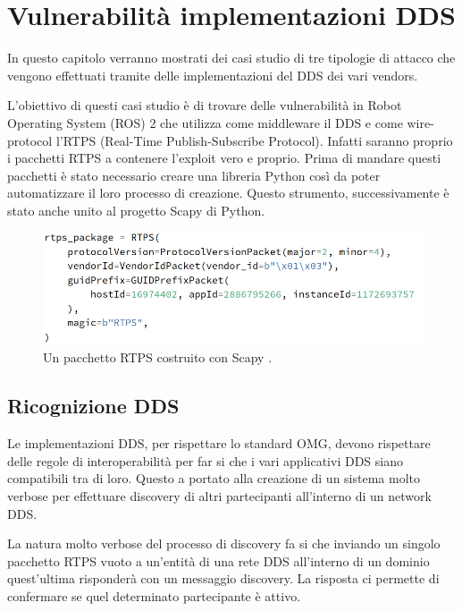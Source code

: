 \chapter{Vulnerabilità implementazioni DDS}
\label{chvulimpldds}

In questo capitolo verranno mostrati dei casi studio
di tre tipologie di 
attacco che vengono effettuati tramite delle 
implementazioni del DDS dei vari vendors.

L'obiettivo di questi casi studio è di trovare delle 
vulnerabilità in Robot Operating System (ROS) 2 che 
utilizza come middleware il DDS e come wire-protocol 
l'RTPS (Real-Time Publish-Subscribe Protocol).
Infatti saranno proprio i pacchetti RTPS a contenere 
l'exploit vero e proprio. Prima di mandare questi 
pacchetti è stato necessario creare una libreria Python 
così da poter automatizzare il loro processo di creazione.
Questo strumento, successivamente è stato anche unito al 
progetto Scapy di Python.

\begin{figure}[H]
    \centering
    \includegraphics[width=15.2cm, keepaspectratio]{img/rptspacketheaderscapy.png}
    \caption{Un pacchetto RTPS costruito 
    con Scapy \cite{mayoral2022robot}.}
    \label{rptspacketheaderscapy}
\end{figure}

\section{Ricognizione DDS}
Le implementazioni DDS, per rispettare lo standard 
OMG, devono rispettare delle regole di interoperabilità 
per far si che i vari applicativi DDS siano compatibili 
tra di loro. Questo a portato alla creazione di un sistema
molto verbose per effettuare discovery 
di altri partecipanti all'interno di un network DDS.


La natura molto verbose del processo di discovery 
fa si che inviando un singolo pacchetto RTPS vuoto 
a un'entità di una rete DDS all'interno di un dominio 
quest'ultima risponderà 
con un messaggio discovery. La risposta ci permette di 
confermare se quel determinato partecipante è attivo.

